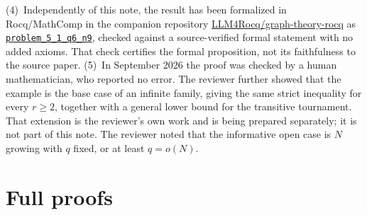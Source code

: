 \documentclass[11pt,a4paper]{article}
\theoremstyle{plain}
\theoremstyle{definition}
\theoremstyle{remark}
\begin{document}
 (4)~Independently of this note, the result has been formalized in Rocq/MathComp in the companion repository \href{https://github.com/LLM4Rocq/graph-theory-rocq}{LLM4Rocq/graph-theory-rocq} as \href{https://github.com/LLM4Rocq/graph-theory-rocq/blob/main/digraph-theory/theories/applications/color_avoiding_tournament.v}{\texttt{problem\_5\_1\_q6\_n9}}, checked against a source-verified formal statement with no added axioms. That check certifies the formal proposition, not its faithfulness to the source paper.
 (5)~In September 2026 the proof was checked by a human mathematician, who reported no error. The reviewer further showed that the example is the base case of an infinite family, giving the same strict inequality for every $r\ge2$, together with a general lower bound for the transitive tournament. That extension is the reviewer's own work and is being prepared separately; it is not part of this note. The reviewer noted that the informative open case is $N$ growing with $q$ fixed, or at least $q=o(N)$.

\appendix

\section{Full proofs}\label{app:proofs}
\end{document}
